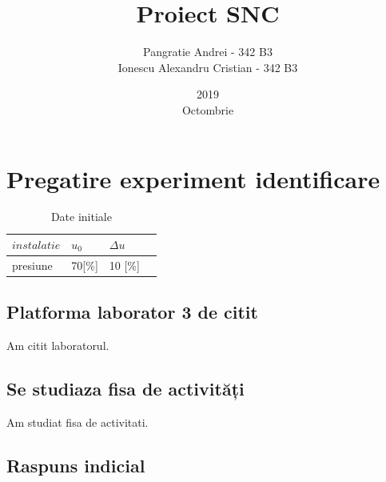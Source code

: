 \documentclass[12pt,english]{article}
\title{Proiect SNC}
\date{2019\\ Octombrie}
\author{Pangratie Andrei - 342 B3\\Ionescu Alexandru Cristian - 342 B3}
\begin{document}
\maketitle
\newpage

\tableofcontents
\newpage

\section {Pregatire experiment identificare }

\begin{table}[H]
  \centering
  \begin{tabular}{|l|l|l|l|}
    \hline
    $instalatie$ & $u_0$ & $\Delta u$ \\
    \hline
    presiune & 70[\%] & 10 [\%] \\
    \hline
  \end{tabular}
  \caption{Date initiale}
\end{table}

\subsection {Platforma laborator 3 de citit }
	Am citit laboratorul.

\subsection {Se studiaza fisa de activități }
	Am studiat fisa de activitati.

\subsection {Raspuns indicial }
\end{document}
